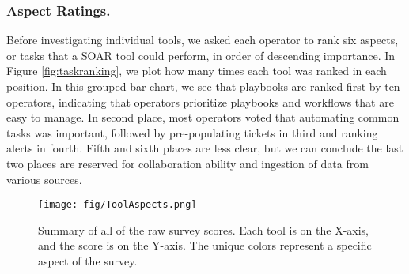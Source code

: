 \subsubsection{Aspect Ratings.}
Before investigating individual tools, we asked each operator to rank six aspects, or tasks that a SOAR tool could perform, in order of descending importance. In Figure \ref{fig:taskranking}, we plot how many times each tool was ranked in each position. In this grouped bar chart, 
we see that playbooks are ranked first by ten operators, indicating that operators prioritize playbooks and workflows that are easy to manage. In second place, most operators voted that automating common tasks was important, followed by pre-populating tickets in third and ranking alerts in fourth.  Fifth and sixth places are less clear, but we can conclude the last two places are reserved for collaboration ability and ingestion of data from various sources.

\begin{wrapfigure}[17]{l}{0.65\textwidth}
    \vspace{-25pt}
    \texttt{[image: fig/ToolAspects.png]}
    \captionsetup{font = scriptsize}
    \vspace{-10pt}
    \caption{Summary of all of the raw survey scores. Each tool is on the X-axis, and the score is on the Y-axis. The unique colors represent a specific aspect of the survey.} 
    \label{fig: RawScore}
\end{wrapfigure} 

